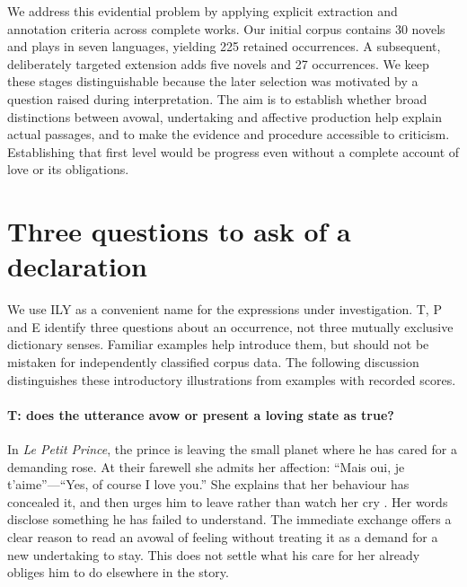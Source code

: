 \documentclass[11pt,a4paper]{article}
\begin{document}
We address this evidential problem by applying explicit extraction and annotation criteria across complete works. Our initial corpus contains 30 novels and plays in seven languages, yielding 225 retained occurrences. A subsequent, deliberately targeted extension adds five novels and 27 occurrences. We keep these stages distinguishable because the later selection was motivated by a question raised during interpretation. The aim is to establish whether broad distinctions between avowal, undertaking and affective production help explain actual passages, and to make the evidence and procedure accessible to criticism. Establishing that first level would be progress even without a complete account of love or its obligations.

\section{Three questions to ask of a declaration}
\label{sec:dimensions}

We use ILY as a convenient name for the expressions under investigation. T, P and E identify three questions about an occurrence, not three mutually exclusive dictionary senses. Familiar examples help introduce them, but should not be mistaken for independently classified corpus data. The following discussion distinguishes these introductory illustrations from examples with recorded scores.

\paragraph{T: does the utterance avow or present a loving state as true?}
In \emph{Le Petit Prince}, the prince is leaving the small planet where he has cared for a demanding rose. At their farewell she admits her affection: “Mais oui, je t'aime”---“Yes, of course I love you.” She explains that her behaviour has concealed it, and then urges him to leave rather than watch her cry \citep[chap.~IX]{saintExupery1943}. Her words disclose something he has failed to understand. The immediate exchange offers a clear reason to read an avowal of feeling without treating it as a demand for a new undertaking to stay. This does not settle what his care for her already obliges him to do elsewhere in the story.
\end{document}
